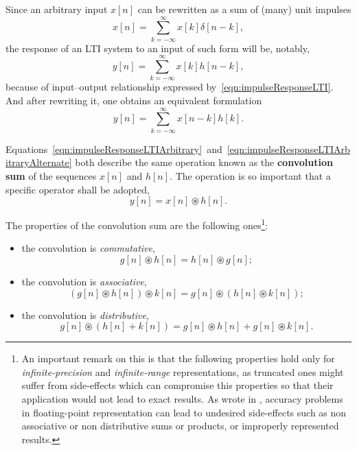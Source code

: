 \documentclass[\documentfontsize, twocolumn]{\classname}
\begin{document}
Since an arbitrary input $x[n]$ can be rewritten as a sum of (many) unit impulses
\begin{equation}\label{eqn:inputAsSumOfImpulses}
    x[n] = \sum_{k=-\infty}^\infty x[k] \delta[n-k],
\end{equation}
the response of an LTI system to an input of such form will be, notably,
\begin{equation}\label{eqn:impulseResponseLTIArbitrary}
    y[n] = \sum_{k=-\infty}^\infty x[k] h[n-k],
\end{equation}
because of input--output relationship expressed by~\ref{eqn:impulseResponseLTI}. And after rewriting it, one obtains an equivalent formulation
\begin{equation}\label{eqn:impulseResponseLTIArbitraryAlternate}
    y[n] = \sum_{k=-\infty}^\infty x[n-k] h[k].
\end{equation}

Equations~\ref{eqn:impulseResponseLTIArbitrary}~and~\ref{eqn:impulseResponseLTIArbitraryAlternate} both describe the same operation known as the \textbf{convolution sum} of the sequences $x[n]$ and $h[n]$. The operation is so important that a specific operator shall be adopted,
\begin{equation}\label{eqn:convolutionSum}
    y[n] = x[n] \circledast h[n].
\end{equation}

The properties of the convolution sum are the following ones\footnote{An important remark on this is that the following properties hold only for \emph{infinite-precision} and \emph{infinite-range} representations, as truncated ones might suffer from side-effects which can compromise this properties so that their application would not lead to exact results. As wrote in \cite{bib:floatingPointPrecisionIssues}, accuracy problems in floating-point representation can lead to undesired side-effects such as non associative or non distributive sums or products, or improperly represented results.}:
\begin{itemize}
    \item the convolution is \emph{commutative},\[ g[n] \circledast h[n] = h[n] \circledast g[n];\]
    \item the convolution is \emph{associative},\[ (g[n] \circledast h[n]) \circledast k[n] = g[n] \circledast (h[n] \circledast k[n]);\]
    \item the convolution is \emph{distributive},\[ g[n] \circledast (h[n] + k[n]) = g[n] \circledast h[n] + g[n] \circledast k[n].\]
\end{itemize}
\end{document}
